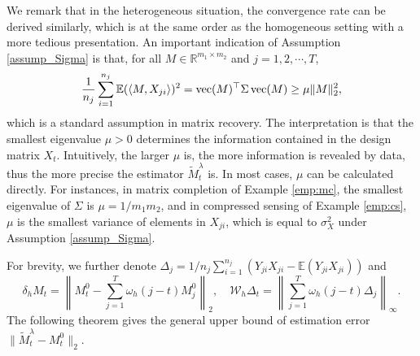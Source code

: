 \documentclass[12pt]{article}
\newcommand{\myvec}[1]%
{\stackrel{\raisebox{-2pt}[0pt][0pt]{\tiny$\rightharpoonup$}}{#1}}
\def\myvec{\mathop{\rm vec}}
\begin{document}
  We remark that in the heterogeneous situation, the convergence rate can be derived similarly, which is at the same order as the homogeneous setting with a more tedious presentation. 
  An important indication of Assumption \ref{assump_Sigma} is that, for all $M\in \mathbb{R}^{m_1\times m_2}$ and $j=1,2,\cdots,T$, %
  \begin{equation*}
  \frac{1}{n_j}\sum_{i=1}^{n_j} \mathbb{E}(\langle M,X_{j i}\rangle )^2 = \myvec({M})^\top \Sigma \myvec({M}) \ge \mu\|M\|_2^2,
  \end{equation*}
  which is a standard assumption in matrix recovery.
The interpretation is that the smallest eigenvalue $\mu>0$ determines the information contained in the design matrix $X_t$. Intuitively, the larger $\mu$ is, the more information is revealed by data, thus the more precise the estimator $\widetilde{M}_t^\lambda$ is.
  In most cases, $\mu$ can be calculated directly. For instances,
  in matrix completion of Example \ref{emp:mc}, the smallest eigenvalue of $\Sigma$ is $\mu = 1/m_1m_2$, and in compressed sensing of Example \ref{emp:cs}, $\mu$ is the smallest variance of elements in $X_{j i}$, which is equal to $\sigma_X^2$ under Assumption \ref{assump_Sigma}. %

  For brevity, we further denote $\Delta_j =1/n_j \sum_{i=1}^{n_j}\left(Y_{j i}X_{j i} - \mathbb{E}(Y_{j i}X_{j i})\right)$ and 
  \begin{equation*}
    \delta_h M_{t} = \left\|M_t^0-\sum_{j=1}^T \omega_h(j-t) M_j^0\right\|_2,\quad \mathcal{W}_h\Delta_{t} =\left\| \sum_{j=1}^T \omega_h(j-t)\Delta_j\right\|_{\infty}.
  \end{equation*}
  The following theorem gives the general upper bound of estimation error $\|\widetilde{M}_t^\lambda - M^0_t\|_2$. %
\end{document}
